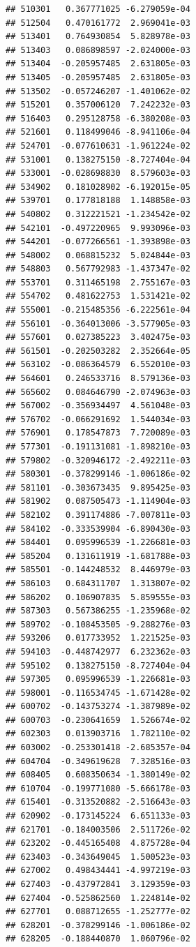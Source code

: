 \documentclass[ignorenonframetext,]{beamer}
\begin{document}
\begin{frame}[fragile]
\begin{verbatim}
## 510301   0.367771025 -6.279059e-04
## 512504   0.470161772  2.969041e-03
## 513401   0.764930854  5.828978e-03
## 513403   0.086898597 -2.024000e-03
## 513404  -0.205957485  2.631805e-03
## 513405  -0.205957485  2.631805e-03
## 513502  -0.057246207 -1.401062e-02
## 515201   0.357006120  7.242232e-03
## 516403   0.295128758 -6.380208e-03
## 521601   0.118499046 -8.941106e-04
## 524701  -0.077610631 -1.961224e-02
## 531001   0.138275150 -8.727404e-04
## 533001  -0.028698830  8.579603e-03
## 534902   0.181028902 -6.192015e-05
## 539701   0.177818188  1.148858e-03
## 540802   0.312221521 -1.234542e-02
## 542101  -0.497220965  9.993096e-03
## 544201  -0.077266561 -1.393898e-03
## 548002   0.068815232  5.024844e-03
## 548803   0.567792983 -1.437347e-02
## 553701   0.311465198  2.755167e-03
## 554702   0.481622753  1.531421e-02
## 555001  -0.215485356 -6.222561e-04
## 556101  -0.364013006 -3.577905e-03
## 557601   0.027385223  3.402475e-03
## 561501  -0.202503282  2.352664e-05
## 563102  -0.086364579  6.552010e-03
## 564601   0.246533716  8.579136e-03
## 565602   0.084646790 -2.074963e-03
## 567002  -0.356934497  4.561048e-03
## 576702  -0.066291692  1.544034e-03
## 576901   0.178547873  7.720089e-03
## 577301  -0.191131081 -1.898210e-03
## 579802  -0.320946172 -2.492211e-03
## 580301  -0.378299146 -1.006186e-02
## 581101  -0.303673435  9.895425e-03
## 581902   0.087505473 -1.114904e-03
## 582102   0.391174886 -7.007811e-03
## 584102  -0.333539904 -6.890430e-03
## 584401   0.095996539 -1.226681e-03
## 585204   0.131611919 -1.681788e-03
## 585501  -0.144248532  8.446979e-03
## 586103   0.684311707  1.313807e-02
## 586202   0.106907835  5.859555e-03
## 587303   0.567386255 -1.235968e-02
## 589702  -0.108453505 -9.288276e-03
## 593206   0.017733952  1.221525e-03
## 594103  -0.448742977  6.232362e-03
## 595102   0.138275150 -8.727404e-04
## 597305   0.095996539 -1.226681e-03
## 598001  -0.116534745 -1.671428e-02
## 600702  -0.143753274 -1.387989e-02
## 600703  -0.230641659  1.526674e-02
## 602303   0.013903716  1.782110e-02
## 603002  -0.253301418 -2.685357e-04
## 604704  -0.349619628  7.328516e-03
## 608405   0.608350634 -1.380149e-02
## 610704  -0.199771080 -5.666178e-03
## 615401  -0.313520882 -2.516643e-03
## 620902  -0.173145224  6.651133e-03
## 621701  -0.184003506  2.511726e-02
## 623202  -0.445165408  4.875728e-04
## 623403  -0.343649045  1.500523e-03
## 627002   0.498434441 -4.997219e-03
## 627403  -0.437972841  3.129359e-03
## 627404  -0.525862560  1.224814e-02
## 627701   0.088712655 -1.252777e-02
## 628201  -0.378299146 -1.006186e-02
## 628205  -0.188440870  1.060796e-02

\end{verbatim}
\end{frame}
\end{document}
